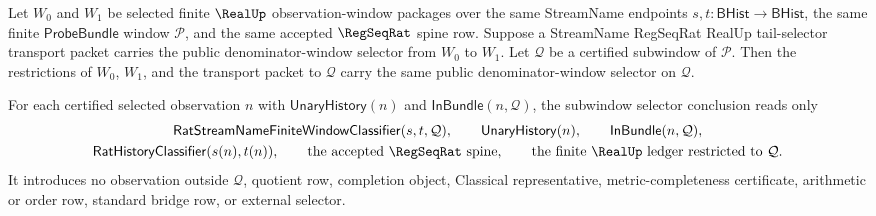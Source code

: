\begin{theorem}
\label{thm:streamname-regseqrat-realup-tail-denominator-selector-subwindow}
Let $W_0$ and $W_1$ be selected finite $\RealUp$ observation-window packages over
the same StreamName endpoints $s,t:\mathsf{BHist}\to\mathsf{BHist}$, the same
finite $\mathsf{ProbeBundle}$ window $\mathcal P$, and the same accepted
$\RegSeqRat$ spine row. Suppose a StreamName RegSeqRat RealUp tail-selector
transport packet carries the public denominator-window selector from $W_0$ to
$W_1$. Let $\mathcal Q$ be a certified subwindow of $\mathcal P$. Then the
restrictions of $W_0$, $W_1$, and the transport packet to $\mathcal Q$ carry the
same public denominator-window selector on $\mathcal Q$.

For each certified selected observation $n$ with $\mathsf{UnaryHistory}(n)$ and
$\mathsf{InBundle}(n,\mathcal Q)$, the subwindow selector conclusion reads only
$$
\begin{gathered}
\mathsf{RatStreamNameFiniteWindowClassifier}(s,t,\mathcal Q),\qquad
\mathsf{UnaryHistory}(n),\qquad
\mathsf{InBundle}(n,\mathcal Q),\\
\mathsf{RatHistoryClassifier}(s(n),t(n)),\qquad
\text{the accepted }\RegSeqRat\text{ spine},\qquad
\text{the finite }\RealUp\text{ ledger restricted to }\mathcal Q .
\end{gathered}
$$
It introduces no observation outside $\mathcal Q$, quotient row, completion
object, Classical representative, metric-completeness certificate, arithmetic or
order row, standard bridge row, or external selector.
\end{theorem}
